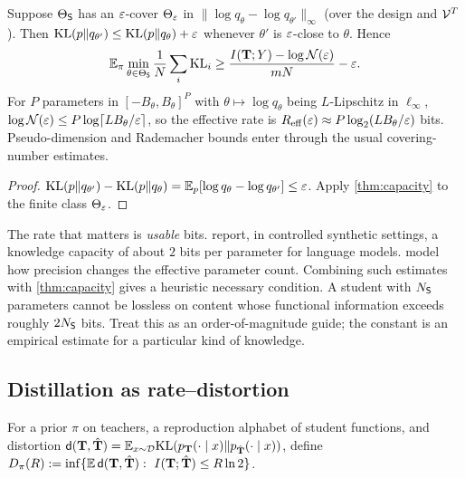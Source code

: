 \begin{corollary}\label{cor:metric}
\Pv Suppose $\Theta_{\mathsf{S}}$ has an $\varepsilon$-cover $\Theta_\varepsilon$ in $\|\log q_\theta-\log q_{\theta'}\|_\infty$ (over the
design and $\mathcal{V}^T$). Then $\mathrm{KL}(p\|q_{\theta'})\le\mathrm{KL}(p\|q_\theta)+\varepsilon$ whenever $\theta'$ is $\varepsilon$-close to
$\theta$. Hence
\[
\mathbb{E}_\pi\min_{\theta\in\Theta_{\mathsf{S}}}\frac1N\sum_i\mathrm{KL}_i\ge\frac{I(\mathbf T;Y)-\log\mathcal{N}(\varepsilon)}{mN}-\varepsilon.
\]
For $P$ parameters in $[-B_\theta,B_\theta]^P$ with $\theta\mapsto\log q_\theta$ being $L$-Lipschitz in $\ell_\infty$,
$\log\mathcal{N}(\varepsilon)\le P\log\lceil LB_\theta/\varepsilon\rceil$, so the effective rate is
$R_{\mathrm{eff}}(\varepsilon)\approx P\log_2(LB_\theta/\varepsilon)$ bits. Pseudo-dimension and Rademacher bounds enter
through the usual covering-number estimates.
\end{corollary}
\begin{proof}
$\mathrm{KL}(p\|q_{\theta'})-\mathrm{KL}(p\|q_\theta)=\mathbb{E}_p[\log q_\theta-\log q_{\theta'}]\le\varepsilon$. Apply \cref{thm:capacity} to
the finite class $\Theta_\varepsilon$.
\end{proof}

\begin{remark}
The rate that matters is \emph{usable} bits. \citet{allenzhu2024physics} report, in controlled synthetic
settings, a knowledge capacity of about $2$ bits per parameter for language models. \citet{kumar2024scaling}
model how precision changes the effective parameter count. Combining such estimates with
\cref{thm:capacity} gives a heuristic necessary condition. A student with $N_{\mathsf{S}}$ parameters cannot be
lossless on content whose functional information exceeds roughly $2N_{\mathsf{S}}$ bits. Treat this as an
order-of-magnitude guide; the constant is an empirical estimate for a particular kind of knowledge.
\end{remark}

\subsection{Distillation as rate--distortion}

\begin{definition}
For a prior $\pi$ on teachers, a reproduction alphabet of student functions, and distortion
$\mathsf d(\mathbf T,\hat{\mathbf T})=\mathbb{E}_{x\sim\mathcal{D}}\mathrm{KL}(p_{\mathbf T}(\cdot\mid x)\|p_{\hat{\mathbf T}}(\cdot\mid x))$, define
$D_\pi(R):=\inf\{\mathbb{E}\,\mathsf d(\mathbf T,\hat{\mathbf T}):\ I(\mathbf T;\hat{\mathbf T})\le R\ln2\}$.
\end{definition}

